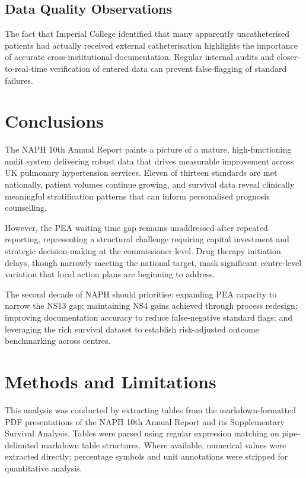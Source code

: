 \documentclass[12pt,a4paper]{article}
\begin{document}
\begin{itemize}
\subsection{Data Quality Observations}
The fact that Imperial College identified that many apparently uncatheterised patients had actually received external catheterisation highlights the importance of accurate cross-institutional documentation. Regular internal audits and closer-to-real-time verification of entered data can prevent false-flagging of standard failures.

\section{Conclusions}

The NAPH 10th Annual Report paints a picture of a mature, high-functioning audit system delivering robust data that drives measurable improvement across UK pulmonary hypertension services. Eleven of thirteen standards are met nationally, patient volumes continue growing, and survival data reveal clinically meaningful stratification patterns that can inform personalised prognosis counselling.

However, the PEA waiting time gap remains unaddressed after repeated reporting, representing a structural challenge requiring capital investment and strategic decision-making at the commissioner level. Drug therapy initiation delays, though narrowly meeting the national target, mask significant centre-level variation that local action plans are beginning to address.

The second decade of NAPH should prioritise: expanding PEA capacity to narrow the NS13 gap; maintaining NS4 gains achieved through process redesign; improving documentation accuracy to reduce false-negative standard flags; and leveraging the rich survival dataset to establish risk-adjusted outcome benchmarking across centres.

\newpage
\section*{Methods and Limitations}

This analysis was conducted by extracting tables from the markdown-formatted PDF presentations of the NAPH 10th Annual Report and its Supplementary Survival Analysis. Tables were parsed using regular expression matching on pipe-delimited markdown table structures. Where available, numerical values were extracted directly; percentage symbols and unit annotations were stripped for quantitative analysis.


\end{itemize}
\end{document}

